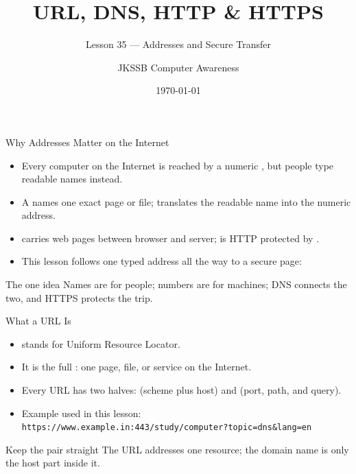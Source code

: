 \documentclass[aspectratio=169]{beamer}
\title{URL, DNS, HTTP \& HTTPS}
\subtitle{Lesson 35 --- Addresses and Secure Transfer}
\author{JKSSB Computer Awareness}
\date{\today}
\begin{document}
\frame{\titlepage}

\begin{frame}{Why Addresses Matter on the Internet}
  \begin{itemize}
    \item Every computer on the Internet is reached by a numeric
      , but people type readable names instead.
    \item A  names one exact page or file;  translates the
      readable name into the numeric address.
    \item {} carries web pages between browser and server;
       is HTTP protected by .
    \item This lesson follows one typed address all the way to a secure
      page: 
  \end{itemize}
  \begin{block}{The one idea}
    Names are for people; numbers are for machines; DNS connects the two,
    and HTTPS protects the trip.
  \end{block}
\end{frame}

\begin{frame}{What a URL Is}
  \begin{itemize}
    \item {} stands for Uniform Resource Locator.
    \item It is the full : one page, file, or
      service on the Internet.
    \item Every URL has two halves:  (scheme plus host)
      and  (port, path, and query).
    \item Example used in this lesson: \\
      \texttt{https://www.example.in:443/study/computer?topic=dns\&lang=en}
  \end{itemize}
  \begin{block}{Keep the pair straight}
    The URL addresses one resource; the domain name is only the host part
    inside it.
  \end{block}
\end{frame}
\end{document}
